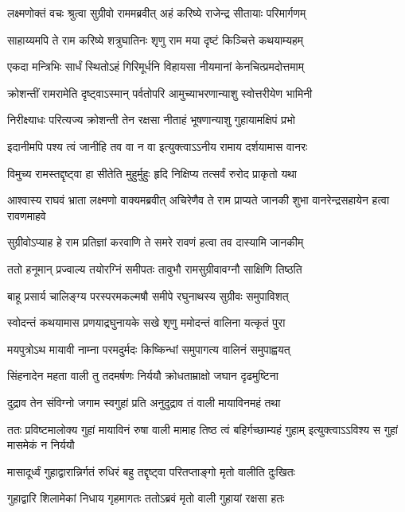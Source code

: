 \twolineshloka
{लक्ष्मणोक्तं वचः श्रुत्वा सुग्रीवो राममब्रवीत्}
{अहं करिष्ये राजेन्द्र सीतायाः परिमार्गणम्} %

\twolineshloka
{साहाय्यमपि ते राम करिष्ये शत्रुघातिनः}
{शृणु राम मया दृष्टं किञ्चित्ते कथयाम्यहम्} %

\twolineshloka
{एकदा मन्त्रिभिः सार्धं स्थितोऽहं गिरिमूर्धनि}
{विहायसा नीयमानां केनचित्प्रमदोत्तमाम्} %

\twolineshloka
{क्रोशन्तीं रामरामेति दृष्ट्वाऽस्मान् पर्वतोपरि}
{आमुच्याभरणान्याशु स्वोत्तरीयेण भामिनी} %

\twolineshloka
{निरीक्ष्याधः परित्यज्य क्रोशन्ती तेन रक्षसा}
{नीताहं भूषणान्याशु गुहायामक्षिपं प्रभो} %

\twolineshloka
{इदानीमपि पश्य त्वं जानीहि तव वा न वा}
{इत्युक्त्वाऽऽनीय रामाय दर्शयामास वानरः} %

\twolineshloka
{विमुच्य रामस्तद्दृष्ट्वा हा सीतेति मुहुर्मुहुः}
{हृदि निक्षिप्य तत्सर्वं रुरोद प्राकृतो यथा} %

\threelineshloka
{आश्वास्य राघवं भ्राता लक्ष्मणो वाक्यमब्रवीत्}
{अचिरेणैव ते राम प्राप्यते जानकी शुभा}
{वानरेन्द्रसहायेन हत्वा रावणमाहवे} %

\twolineshloka
{सुग्रीवोऽप्याह हे राम प्रतिज्ञां करवाणि ते}
{समरे रावणं हत्वा तव दास्यामि जानकीम्} %

\twolineshloka
{ततो हनूमान् प्रज्वाल्य तयोरग्निं समीपतः}
{तावुभौ रामसुग्रीवावग्नौ साक्षिणि तिष्ठति} %

\twolineshloka
{बाहू प्रसार्य चालिङ्ग्य परस्परमकल्मषौ}
{समीपे रघुनाथस्य सुग्रीवः समुपाविशत्} %

\twolineshloka
{स्वोदन्तं कथयामास प्रणयाद्रघुनायके}
{सखे शृणु ममोदन्तं वालिना यत्कृतं पुरा} %

\twolineshloka
{मयपुत्रोऽथ मायावी नाम्ना परमदुर्मदः}
{किष्किन्धां समुपागत्य वालिनं समुपाह्वयत्} %

\twolineshloka
{सिंहनादेन महता वाली तु तदमर्षणः}
{निर्ययौ क्रोधताम्राक्षो जघान दृढमुष्टिना} %

\twolineshloka
{दुद्राव तेन संविग्नो जगाम स्वगुहां प्रति}
{अनुदुद्राव तं वाली मायाविनमहं तथा} %

\threelineshloka
{ततः प्रविष्टमालोक्य गुहां मायाविनं रुषा}
{वाली मामाह तिष्ठ त्वं बहिर्गच्छाम्यहं गुहाम्}
{इत्युक्त्वाऽऽविश्य स गुहां मासमेकं न निर्ययौ} %

\twolineshloka
{मासादूर्ध्वं गुहाद्वारान्निर्गतं रुधिरं बहु}
{तद्दृष्ट्वा परितप्ताङ्गो मृतो वालीति दुःखितः} %

\twolineshloka
{गुहाद्वारि शिलामेकां निधाय गृहमागतः}
{ततोऽब्रवं मृतो वाली गुहायां रक्षसा हतः} %

